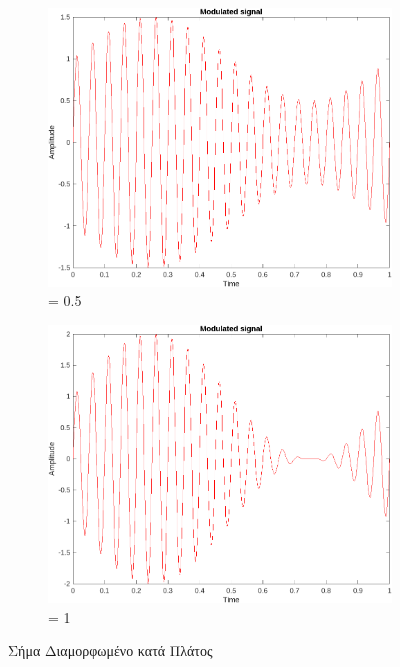 \documentclass[12pt]{report}
\begin{document}
        \begin{figure}[h]
            \centering
            \begin{subfigure}{0.45\linewidth}
                \includegraphics[width=\linewidth]{AMmudot5.png}
                \caption{\mu = 0.5}
                \label{img:AMmudot5}
            \end{subfigure}
            \begin{subfigure}{0.45\linewidth}
                \includegraphics[width=\linewidth]{AMmu1.png}
                \caption{\mu = 1}
                \label{img:AMmu1}
            \end{subfigure}

            \caption{Σήμα Διαμορφωμένο κατά Πλάτος}
            \label{img:AMmu}
        \end{figure}
\end{document}
